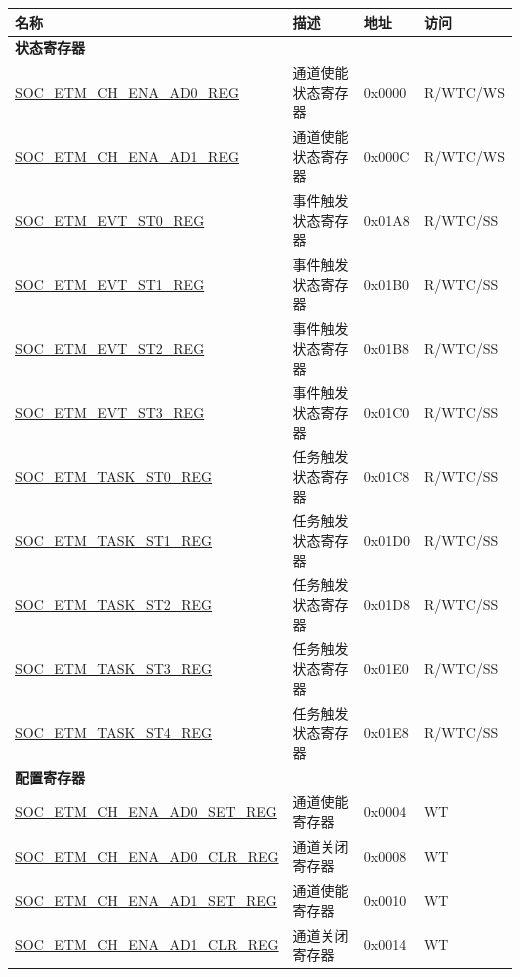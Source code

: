 \begin{longtable}{ | p{6cm} | p{6.2cm} | p{1.3cm} | p{2cm} | }
\hline\rowcolor{lightgray}
\textbf{名称} & \textbf{描述} &  \textbf{地址} & \textbf{访问} \\ \hline
\endhead
\multicolumn{4}{|l|}{\textbf{状态寄存器}} \\ \hline
\hyperref[regdesc:SOCETMCHENAAD0REG]{SOC\_ETM\_CH\_ENA\_AD0\_REG} & 通道使能状态寄存器 & 0x0000 & R/WTC/WS \\ \hline
\hyperref[regdesc:SOCETMCHENAAD1REG]{SOC\_ETM\_CH\_ENA\_AD1\_REG} & 通道使能状态寄存器 & 0x000C & R/WTC/WS \\ \hline
\hyperref[regdesc:SOCETMEVTST0REG]{SOC\_ETM\_EVT\_ST0\_REG} & 事件触发状态寄存器 & 0x01A8 & R/WTC/SS \\ \hline
\hyperref[regdesc:SOCETMEVTST1REG]{SOC\_ETM\_EVT\_ST1\_REG} & 事件触发状态寄存器 & 0x01B0 & R/WTC/SS \\ \hline
\hyperref[regdesc:SOCETMEVTST2REG]{SOC\_ETM\_EVT\_ST2\_REG} & 事件触发状态寄存器 & 0x01B8 & R/WTC/SS \\ \hline
\hyperref[regdesc:SOCETMEVTST3REG]{SOC\_ETM\_EVT\_ST3\_REG} & 事件触发状态寄存器 & 0x01C0 & R/WTC/SS \\ \hline
\hyperref[regdesc:SOCETMTASKST0REG]{SOC\_ETM\_TASK\_ST0\_REG} & 任务触发状态寄存器 & 0x01C8 & R/WTC/SS \\ \hline
\hyperref[regdesc:SOCETMTASKST1REG]{SOC\_ETM\_TASK\_ST1\_REG} & 任务触发状态寄存器 & 0x01D0 & R/WTC/SS \\ \hline
\hyperref[regdesc:SOCETMTASKST2REG]{SOC\_ETM\_TASK\_ST2\_REG} & 任务触发状态寄存器 & 0x01D8 & R/WTC/SS \\ \hline
\hyperref[regdesc:SOCETMTASKST3REG]{SOC\_ETM\_TASK\_ST3\_REG} & 任务触发状态寄存器 & 0x01E0 & R/WTC/SS \\ \hline
\hyperref[regdesc:SOCETMTASKST4REG]{SOC\_ETM\_TASK\_ST4\_REG} & 任务触发状态寄存器 & 0x01E8 & R/WTC/SS \\ \hline
\multicolumn{4}{|l|}{\textbf{配置寄存器}} \\ \hline
\hyperref[regdesc:SOCETMCHENAAD0SETREG]{SOC\_ETM\_CH\_ENA\_AD0\_SET\_REG} & 通道使能寄存器 & 0x0004 & WT \\ \hline
\hyperref[regdesc:SOCETMCHENAAD0CLRREG]{SOC\_ETM\_CH\_ENA\_AD0\_CLR\_REG} & 通道关闭寄存器 & 0x0008 & WT \\ \hline
\hyperref[regdesc:SOCETMCHENAAD1SETREG]{SOC\_ETM\_CH\_ENA\_AD1\_SET\_REG} & 通道使能寄存器 & 0x0010 & WT \\ \hline
\hyperref[regdesc:SOCETMCHENAAD1CLRREG]{SOC\_ETM\_CH\_ENA\_AD1\_CLR\_REG} & 通道关闭寄存器 & 0x0014 & WT \\ \hline

\end{longtable}

